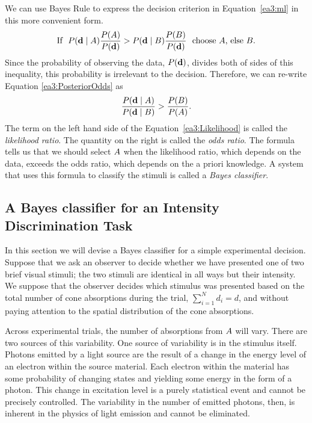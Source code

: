 We can use Bayes Rule to express the decision criterion in
Equation~\ref{ea3:ml} in this more convenient form.
\begin{equation}
\label{ea3:PosteriorOdds}
\mbox{If}~~ 
  P(\mbox{${\bf d}$} \mid \mbox{$A$}) \frac { P(\mbox{$A$})}{ P(\mbox{${\bf d}$}) } > 
  P(\mbox{${\bf d}$} \mid \mbox{$B$}) \frac{ P(\mbox{$B$}) }{ P(\mbox{${\bf d}$}) } 
~~\mbox{choose $\mbox{$A$}$, else $\mbox{$B$}$}.
\end{equation}
Since the probability of observing the data, $P(\mbox{${\bf d}$})$, divides both
of sides of this inequality, this probability is irrelevant to the
decision.  Therefore, we can re-write Equation \ref{ea3:PosteriorOdds}
as
\begin{equation}
\label{ea3:Likelihood}
\frac{ P(\mbox{${\bf d}$} \mid \mbox{$A$}) }{ P(\mbox{${\bf d}$} \mid \mbox{$B$}) } > 
  \frac{ P(\mbox{$B$}) } { P(\mbox{$A$}) }.
\end{equation}
The term on the left hand side of the Equation~\ref{ea3:Likelihood} is
called the {\em likelihood ratio}.  The quantity on the right is
called the {\em odds ratio}.  The formula tells us that we should
select $\mbox{$A$}$ when the likelihood ratio, which depends on the data,
exceeds the odds ratio, which depends on the a priori knowledge.  A
system that uses this formula to classify the stimuli is called a {\em
Bayes classifier}.

\subsection*{A Bayes classifier for an Intensity Discrimination Task}
In this section we will devise a Bayes classifier for a simple
experimental decision.  Suppose that we ask an observer to decide
whether we have presented one of two brief visual stimuli; the two
stimuli are identical in all ways but their intensity.  We suppose
that the observer decides which stimulus was presented based on the
total number of cone absorptions during the trial, $\sum_{i=1}^{N} d_i
= d$, and without paying attention to the spatial distribution of the
cone absorptions.

Across experimental trials, the number of absorptions from $\mbox{$A$}$
will vary.  There are two sources of this variability.  One source of
variability is in the stimulus itself.  Photons emitted by a light
source are the result of a change in the energy level of an electron
within the source material.  Each electron within the material has
some probability of changing states and yielding some energy in the
form of a photon.  This change in excitation level is a purely
statistical event and cannot be precisely controlled.  The variability
in the number of emitted photons, then, is inherent in the physics of
light emission and cannot be eliminated.

